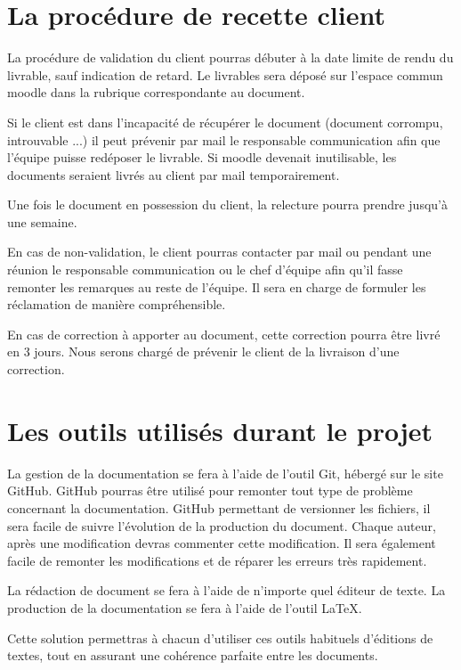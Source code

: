 \section{La procédure de recette client}

La procédure de validation du client pourras débuter à la date limite de rendu du livrable, sauf indication de retard. Le livrables sera déposé sur l'espace commun moodle dans la rubrique correspondante au document.

Si le client est dans l’incapacité de récupérer le document (document corrompu, introuvable ...) il peut prévenir par mail le responsable communication afin que l’équipe puisse redéposer le livrable.
Si moodle devenait inutilisable, les documents seraient livrés au client par mail temporairement.

Une fois le document en possession du client, la relecture pourra prendre jusqu’à une semaine.

En cas de non-validation, le client pourras contacter par mail ou pendant une réunion le responsable communication ou le chef d’équipe afin qu’il fasse remonter les remarques au reste de l’équipe.
Il sera en charge de formuler les réclamation de manière compréhensible.

En cas de correction à apporter au document, cette correction pourra être livré en 3 jours.
Nous serons chargé de prévenir le client de la livraison d’une correction.

\section{Les outils utilisés durant le projet}

La gestion de la documentation se fera à l’aide de l’outil Git, hébergé sur le site GitHub.
GitHub pourras être utilisé pour remonter tout type de problème concernant la documentation.
GitHub permettant de versionner les fichiers, il sera facile de suivre l'évolution de la production du document.
Chaque auteur, après une modification devras commenter cette modification.
Il sera également facile de remonter les modifications et de réparer les erreurs très rapidement.

La rédaction de document se fera à l’aide de n’importe quel éditeur de texte.
La production de la documentation se fera à l’aide de l'outil LaTeX.

Cette solution permettras à chacun  d’utiliser ces outils habituels d’éditions de textes, tout en assurant une cohérence parfaite entre les documents.

